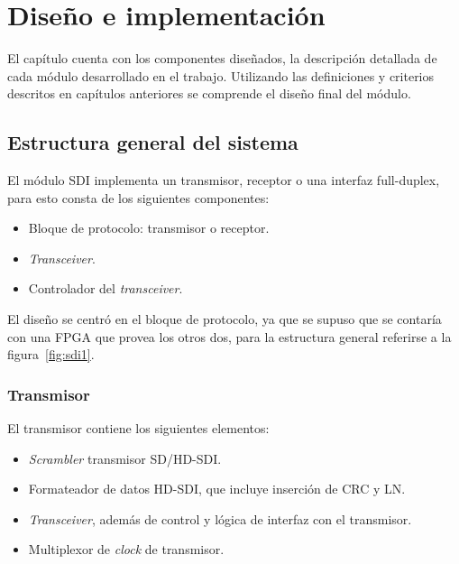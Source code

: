 \chapter{Diseño e implementación}\label{Chapter3}

El capítulo cuenta con los componentes diseñados, la descripción
detallada de cada módulo desarrollado en el trabajo. Utilizando las definiciones
y criterios descritos en capítulos anteriores se comprende el diseño final del módulo.


\section{Estructura general del sistema}

  El módulo SDI implementa un transmisor, receptor o una interfaz full-duplex,
  para esto consta de los siguientes componentes:

  \begin{itemize}
      \item Bloque de protocolo: transmisor o receptor.
      \item \textit{Transceiver}.
      \item Controlador del \textit{transceiver}.
  \end{itemize}


  El diseño se centró en el bloque de protocolo, ya que se supuso que se contaría con
  una FPGA que provea los otros dos, para la estructura general referirse a la
  figura~\ref{fig:sdi1}.

\subsection{Transmisor}

  El transmisor contiene los siguientes elementos:

  \begin{itemize}
      \item \textit{Scrambler} transmisor SD/HD-SDI\@.
      \item Formateador de datos HD-SDI, que incluye inserción de CRC y LN\@.
      \item \textit{Transceiver}, además de control y lógica de interfaz con el transmisor.
      \item Multiplexor de \textit{clock} de transmisor.
  \end{itemize}

